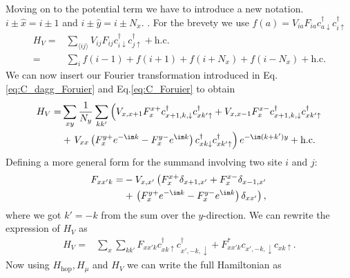 \documentclass[../main.tex]{subfile}
\begin{document}
Moving on to the potential term we have to introduce a new notation. $i\pm\hat{x} = i\pm 1$ and $i\pm\hat{y} = i\pm N_x$. .
For the brevety we use $f(a) = V_{ia}F_{ia} c^{\dagger}_{a\downarrow} c^{\dagger}_{i\uparrow}$ 
\begin{align*}
    H_V =& \sum_{\langle ij\rangle} V_{ij} F_{ij} c^{\dagger}_{i\downarrow} c^{\dagger}_{j\uparrow} + \text{h.c.} \\
    =& \sum_{i} f(i-1) + f(i+1) + f(i+N_x) + f(i-N_x) + \text{h.c.}
\end{align*}
We can now insert our Fourier transformation introduced in Eq.\ref{eq:C_dagg_Foruier} and Eq.\ref{eq:C_Foruier} to obtain
\begin{align*}
    H_V =& \sum_{xy} \frac{1}{N_y} \sum_{kk'} \left( V_{x,x+1} F_{x}^{x+} c^{\dagger}_{x+1,k,\downarrow}c^{\dagger}_{xk'\uparrow} + V_{x,x-1} F_{x}^{x-} c^{\dagger}_{x+1,k,\downarrow} c^{\dagger}_{xk'\uparrow} \right.\\
        &+ \left.V_{xx}\left( F_{x}^{y+} e^{-\im k}  - F_{x}^{y-} e^{\im k}\right) c^{\dagger}_{xk\downarrow} c^{\dagger}_{xk'\uparrow} \right) e^{-\im(k + k')y} + \text{h.c.}\\
\end{align*}
Defining a more general form for the summand involving two site $i$ and $j$:
\begin{equation*}
    \begin{aligned}
    F_{xx'k} =& - V_{x,x'}\left( F_{x}^{x+} \delta_{x+1,x'} +  F_{x}^{x-} \delta_{x-1,x'}\right. \\
        &+ \left.\left( F_{x}^{y+} e^{-\im k}  - F_{x}^{y-} e^{\im k}\right)\delta_{xx'}\right),
    \end{aligned}
\end{equation*} 
where we got $k' = -k$ from the sum over the $y$-direction. We can rewrite the expression of $H_V$ as
\begin{align*}
    H_V =& \sum_{x} \sum_{kk'} F_{xx'k} c^{\dagger}_{xk\uparrow} c^{\dagger}_{x',-k,\downarrow} + F_{xx'k}^{\ast} c_{x',-k,\downarrow} c_{xk\uparrow}.
\end{align*}
Now using $H_{\text{hop}}, H_{\mu}$ and $H_{V}$ we can write the full Hamiltonian as
\end{document}
